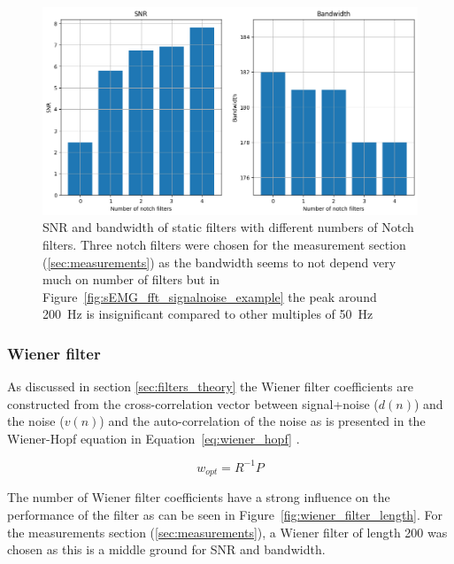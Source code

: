 \begin{figure}[h!t]
	\begin{center}
		\includegraphics[width=1.0\columnwidth]{images/staticfilter_notches_barchart.png}
	\end{center}
	\caption{SNR and bandwidth of static filters with different numbers of Notch filters. Three notch filters were chosen for the measurement section (\ref{sec:measurements}) as the bandwidth seems to not depend very much on number of filters but in Figure~\ref{fig:sEMG_fft_signalnoise_example} the peak around \SI{200}{\hertz} is insignificant compared to other multiples of \SI{50}{\hertz}}
	\label{fig:staticfilter_notches_barchart}
\end{figure}


\subsubsection{Wiener filter}
As discussed in section \ref{sec:filters_theory} the Wiener filter coefficients are constructed from the cross-correlation vector between signal+noise ($d(n)$) and the noise ($v(n)$) and the auto-correlation of the noise as is presented in the Wiener-Hopf equation in Equation~\ref{eq:wiener_hopf} \cite{lecture_adaptive_filters_1}. 

\begin{equation}
    w_{opt} = R^{-1}P
    \label{eq:wiener_hopf}
\end{equation}

The number of Wiener filter coefficients have a strong influence on the performance of the filter as can be seen in Figure~\ref{fig:wiener_filter_length}. For the measurements section (\ref{sec:measurements}), a Wiener filter of length 200 was chosen as this is a middle ground for SNR and bandwidth.

